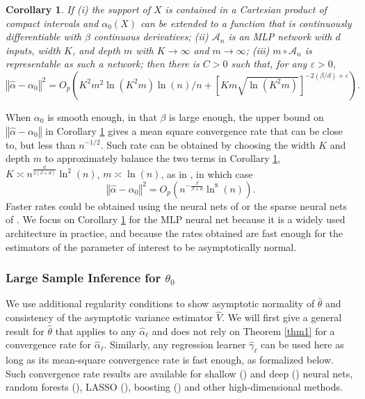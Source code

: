 \documentclass[aos]{imsart}
\numberwithin{equation}{section}
\theoremstyle{plain}
\newtheorem{corollary}[theorem]{Corollary}
\theoremstyle{remark}
\begin{document}
\begin{corollary}\label{cor1}
If (i) the support of $X$ is contained in a Cartesian product of compact intervals and $\alpha_{0}(X)$ can be extended to a function that is continuously differentiable with $\beta$ continuous derivatives; (ii) $\mathcal{A}_n$ is an MLP network with $d$ inputs, width $K$, and depth $m$ with $K\to\infty$ and $m\to\infty$; (iii) $m\circ\mathcal{A}_n$ is representable as such a network; then there is $C>0$ such that, for any $\varepsilon >0$, 
\[
\left\Vert \hat{\alpha}-\alpha_{0}\right\Vert^{2}=O_{p}(K^{2}m^{2}\ln
(K^{2}m)\ln(n)/n+[Km\sqrt{\ln(K^{2}m)}]^{-2(\beta/d)+\varepsilon}).
\]
\end{corollary}
When $\alpha_{0}$ is smooth enough, in that $\beta$ is large enough, the upper bound on $\left\Vert \hat{\alpha} -\alpha_{0}\right\Vert $ in Corollary \ref{cor1} gives a mean square convergence rate that can be close to, but less than $n^{-1/2}$. Such rate can be obtained by choosing the width $K$ and depth $m$ to approximately balance the two terms in Corollary \ref{cor1}, $K \asymp n^{\frac{d}{2(\beta + d)}}\ln^2(n)$, $m \asymp \ln(n)$, as in \cite{farrell2021deep}, in which case
\[
\left\Vert \hat{\alpha}-\alpha_{0}\right\Vert^{2} = O_p\left(n^{-\frac{\beta}{\beta + d} }\ln^8(n)\right).
\]
Faster rates could be obtained using the neural nets of \cite{yarotsky2018optimal} or the sparse neural nets of \cite{schmidt2020nonparametric}. We focus on Corollary \ref{cor1} for the MLP neural net because it is a widely used architecture in practice, and because the rates obtained are fast enough for the estimators of the parameter of interest to be asymptotically normal.

\subsubsection{Large Sample Inference for $\theta_{0}$}
We use additional regularity conditions to show asymptotic normality of $\hat{\theta}$ and consistency of the asymptotic variance estimator $\hat{V}$. We will first give a general result for $\hat{\theta}$ that applies to any $\hat{\alpha}_{\ell}$ and does not rely on Theorem \ref{thm1} for a convergence rate for $\hat{\alpha}_{\ell}$. Similarly, any regression learner $\hat{\gamma}_\ell$ can be used here as long as its mean-square convergence rate is fast enough, as formalized below. Such convergence rate results are available for shallow (\cite{chen1999improved}) and deep (\cite{yarotsky2018optimal, schmidt2020nonparametric, farrell2021deep}) neural nets, random forests (\cite{syrgkanis2020estimation}), LASSO (\cite{bickel2009simultaneous}), boosting (\cite{luo2022highdimensional}) and other high-dimensional methods.
\end{document}
